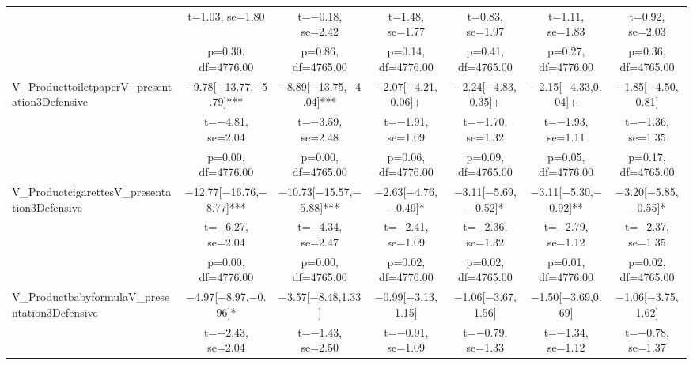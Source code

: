 \documentclass[]{report}
\begin{document}
\begin{table}
{\begin{tabular}[t]{lcccccc}
		& t=\num{1.03}, se=\num{1.80} & t=\num{-0.18}, se=\num{2.42} & t=\num{1.48}, se=\num{1.77} & t=\num{0.83}, se=\num{1.97} & t=\num{1.11}, se=\num{1.83} & t=\num{0.92}, se=\num{2.03}\\
		& p=\num{0.30}, df=\num{4776.00} & p=\num{0.86}, df=\num{4765.00} & p=\num{0.14}, df=\num{4776.00} & p=\num{0.41}, df=\num{4765.00} & p=\num{0.27}, df=\num{4776.00} & p=\num{0.36}, df=\num{4765.00}\\
		V\_ProducttoiletpaperV\_presentation3Defensive & \num{-9.78}[\num{-13.77},\num{-5.79}]*** & \num{-8.89}[\num{-13.75},\num{-4.04}]*** & \num{-2.07}[\num{-4.21},\num{0.06}]+ & \num{-2.24}[\num{-4.83},\num{0.35}]+ & \num{-2.15}[\num{-4.33},\num{0.04}]+ & \num{-1.85}[\num{-4.50},\num{0.81}]\\
		& t=\num{-4.81}, se=\num{2.04} & t=\num{-3.59}, se=\num{2.48} & t=\num{-1.91}, se=\num{1.09} & t=\num{-1.70}, se=\num{1.32} & t=\num{-1.93}, se=\num{1.11} & t=\num{-1.36}, se=\num{1.35}\\
		& p=\num{0.00}, df=\num{4776.00} & p=\num{0.00}, df=\num{4765.00} & p=\num{0.06}, df=\num{4776.00} & p=\num{0.09}, df=\num{4765.00} & p=\num{0.05}, df=\num{4776.00} & p=\num{0.17}, df=\num{4765.00}\\
		V\_ProductcigarettesV\_presentation3Defensive & \num{-12.77}[\num{-16.76},\num{-8.77}]*** & \num{-10.73}[\num{-15.57},\num{-5.88}]*** & \num{-2.63}[\num{-4.76},\num{-0.49}]* & \num{-3.11}[\num{-5.69},\num{-0.52}]* & \num{-3.11}[\num{-5.30},\num{-0.92}]** & \num{-3.20}[\num{-5.85},\num{-0.55}]*\\
		& t=\num{-6.27}, se=\num{2.04} & t=\num{-4.34}, se=\num{2.47} & t=\num{-2.41}, se=\num{1.09} & t=\num{-2.36}, se=\num{1.32} & t=\num{-2.79}, se=\num{1.12} & t=\num{-2.37}, se=\num{1.35}\\
		& p=\num{0.00}, df=\num{4776.00} & p=\num{0.00}, df=\num{4765.00} & p=\num{0.02}, df=\num{4776.00} & p=\num{0.02}, df=\num{4765.00} & p=\num{0.01}, df=\num{4776.00} & p=\num{0.02}, df=\num{4765.00}\\
		V\_ProductbabyformulaV\_presentation3Defensive & \num{-4.97}[\num{-8.97},\num{-0.96}]* & \num{-3.57}[\num{-8.48},\num{1.33}] & \num{-0.99}[\num{-3.13},\num{1.15}] & \num{-1.06}[\num{-3.67},\num{1.56}] & \num{-1.50}[\num{-3.69},\num{0.69}] & \num{-1.06}[\num{-3.75},\num{1.62}]\\
		& t=\num{-2.43}, se=\num{2.04} & t=\num{-1.43}, se=\num{2.50} & t=\num{-0.91}, se=\num{1.09} & t=\num{-0.79}, se=\num{1.33} & t=\num{-1.34}, se=\num{1.12} & t=\num{-0.78}, se=\num{1.37}\\

\end{tabular}}
\end{table}
\end{document}

